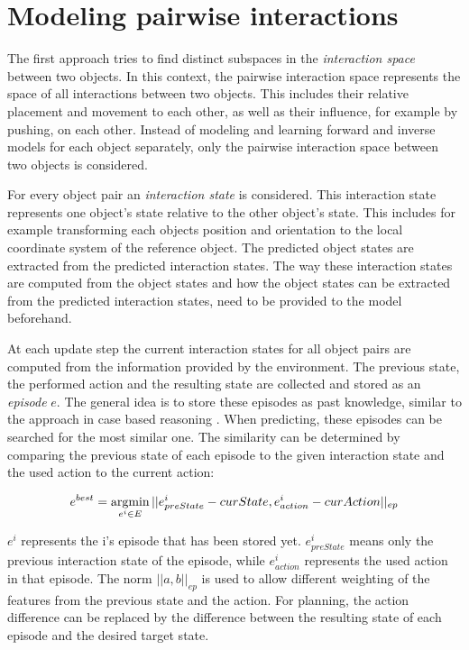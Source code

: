 \section{Modeling pairwise interactions \label{sec:pairInt}}
The first approach tries to find distinct subspaces in the \textit{interaction space} between two objects. In this context, the pairwise interaction space represents the space of all interactions between two objects. This includes their relative placement and movement to each other, as well as their influence, for example by pushing, on each other. Instead of modeling and learning forward and inverse models for each object separately, only the pairwise interaction space between two objects is considered. %

For every object pair an \textit{interaction state} is considered. This interaction state represents one object's state relative to the other object's state. This includes for example transforming each objects position and orientation to the local coordinate system of the reference object. %
The predicted object states are extracted from the predicted interaction states. The way these interaction states are computed from the object states and how the object states can be extracted from the predicted interaction states, need to be provided to the model beforehand. %

At each update step the current interaction states for all object pairs are computed from the information provided by the environment. The previous state, the performed action and the resulting state are collected and stored as an \textit{episode} $e$. The general idea is to store these episodes as past knowledge, similar to the approach in case based reasoning \cite{cbr}. When predicting, these episodes can be searched for the most similar one. The similarity can be determined by comparing the previous state of each episode to the given interaction state and the used action to the current action:

\begin{equation}
e^{best} = \argmin_{e^i \in E} ||e^i_{preState}-curState, e^i_{action}-curAction||_{ep}
\label{eq:bestEpisode}
\end{equation}


$e^i$ represents the i's episode that has been stored yet. $e^i_{preState}$ means only the previous interaction state of the episode, while $e^i_{action}$ represents the used action in that episode.
The norm $||a,b||_{ep}$ is used to allow different weighting of the features from the previous state and the action. For planning, the action difference can be replaced by the difference between the resulting state of each episode and the desired target state.

